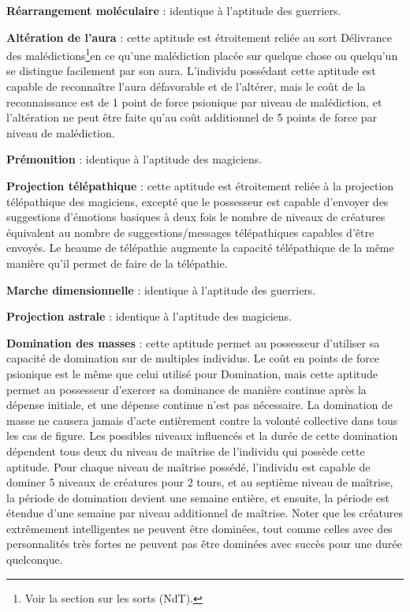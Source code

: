 \documentclass[11pt]{article}
\begin{document}
{\bigskip

\textbf{Réarrangement moléculaire} : identique à l'aptitude des guerriers.

\bigskip

\textbf{Altération de l'aura} : cette aptitude est étroitement reliée au sort Délivrance des malédictions\footnote{Voir la section sur les sorts (NdT).}en ce qu'une malédiction placée sur quelque chose ou quelqu'un se distingue facilement par son aura. L'individu possédant cette aptitude est capable de reconnaître l'aura défavorable et de l'altérer, mais le coût de la reconnaissance est de 1 point de force psionique par niveau de malédiction, et l'altération ne peut être faite qu'au coût additionnel de 5 points de force par niveau de malédiction.

\bigskip

\textbf{Prémonition} : identique à l'aptitude des magiciens.

\bigskip

\textbf{Projection télépathique} : cette aptitude est étroitement reliée à la projection télépathique des magiciens, excepté que le possesseur est capable d'envoyer des suggestions d'émotions basiques à deux fois le nombre de niveaux de créatures équivalent au nombre de suggestions/messages télépathiques capables d'être envoyés.%
Le heaume de télépathie augmente la capacité télépathique de la même manière qu'il permet de faire de la télépathie.

\bigskip

\textbf{Marche dimensionnelle} : identique à l'aptitude des guerriers.

\bigskip

\textbf{Projection astrale} : identique à l'aptitude des magiciens.

\bigskip

\textbf{Domination des masses} : cette aptitude permet au possesseur d'utiliser sa capacité de domination sur de multiples individus. Le coût en points de force psionique est le même que celui utilisé pour Domination, mais cette aptitude permet au possesseur d'exercer sa dominance de manière continue après la dépense initiale, et une dépense continue n'est pas nécessaire. La domination de masse ne causera jamais d'acte entièrement contre la volonté collective dans tous les cas de figure. Les possibles niveaux influencés et la durée de cette domination dépendent tous deux du niveau de maîtrise de l'individu qui possède cette aptitude. Pour chaque niveau de maîtrise possédé, l'individu est capable de dominer 5 niveaux de créatures pour 2 tours, et au septième niveau de maîtrise, la période de domination devient une semaine entière, et ensuite, la période est étendue d'une semaine par niveau additionnel de maîtrise. Noter que les créatures extrêmement intelligentes ne peuvent être dominées, tout comme celles avec des personnalités très fortes ne peuvent pas être dominées avec succès pour une durée quelconque.

}
\end{document}
